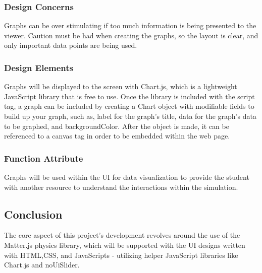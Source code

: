 \subsubsection{Design Concerns}
Graphs can be over stimulating if too much information is being presented to the viewer. Caution must be had when creating the graphs, so the layout is clear, and only important data points are being used.

\subsubsection{Design Elements}
 Graphs will be displayed to the screen with Chart.js, which is a lightweight JavaScript library that is free to use. Once the library is included with the script tag, a graph can be included by creating a Chart object with modifiable fields to build up your graph, such as, label for the graph's title, data for the graph's data to be graphed, and backgroundColor. After the object is made, it can be referenced to a canvas tag in order to be embedded within the web page.

\subsubsection{Function Attribute}
Graphs will be used within the UI for data visualization to provide the student with another resource to understand the interactions within the simulation.


\subsection{Conclusion}
The core aspect of this project's development revolves around the use of the Matter.js physics library, which will be supported with the UI designs written with HTML,CSS, and JavaScripts - utilizing helper JavaScript libraries like Chart.js and noUiSlider. 
